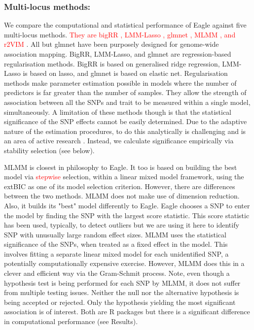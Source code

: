 \documentclass{article}
\begin{document}
 \subsubsection{ Multi-locus methods:} We compare the computational and statistical performance of Eagle against five multi-locus methods. \textcolor{red}{They are bigRR  \citep{shen2013novel}, LMM-Lasso \citep{rakitsch2013lasso}, glmnet \citep{Friedman2010glmnet}, 
MLMM \citep{segura2012efficient}, and r2VIM \citep{szymczak2016r2vim}}.  All but glmnet have been purposely designed for genome-wide association mapping. 
BigRR, LMM-Lasso, and glmnet are regression-based regularisation 
methods. BigRR is based on generalised ridge regression, LMM-Lasso is based on lasso, and glmnet is based on elastic net. 
Regularisation methods make parameter estimation possible in models  where the number of predictors is far greater than the number of samples. 
They allow the strength of association between all the SNPs and trait to be measured within a single model, simultaneously. 
A limitation of these methods though is that the statistical significance of the SNP effects cannot be easily determined. 
 Due to the adaptive nature of the estimation procedures, to do this 
analytically is challenging and is an area of active research \citep{lockhart2014significance}. Instead, we calculate significance empirically via 
stability selection (see below). 

MLMM is closest in philosophy to Eagle. It too is based on building the best model via \textcolor{red}{stepwise} selection, 
within  a linear mixed model framework, using the 
extBIC as one of its model selection criterion. However, there are differences between the two methods.  MLMM does not make use of dimension reduction. Also, it builds its "best" 
model differently to Eagle.  Eagle chooses a SNP to enter the model by finding the SNP with the largest score statistic. 
This score statistic has been used, typically, to detect outliers  but we are using it here to identify SNP with 
unusually large random effect sizes. 
MLMM uses the statistical significance of the SNPs,  when treated as a fixed effect in the model. This involves fitting a separate linear mixed model for each unidentified SNP, a 
potentially computationally expensive exercise. However, MLMM does this in a clever and efficient way via the Gram-Schmit process. 
Note, even though a hypothesis test is being performed for each SNP by MLMM, it does not suffer from multiple testing issues. 
Neither the null nor the alternative hypothesis is being accepted or rejected. Only the hypothesis yielding the most significant association is 
of interest. 
Both are R packages but there is a significant difference in computational performance (see Results). 
\end{document}
